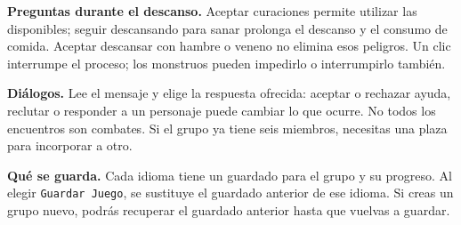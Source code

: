 \textbf{Preguntas durante el descanso.} Aceptar curaciones permite utilizar las disponibles; seguir descansando para sanar prolonga el descanso y el consumo de comida. Aceptar descansar con hambre o veneno no elimina esos peligros. Un clic interrumpe el proceso; los monstruos pueden impedirlo o interrumpirlo también.

\textbf{Diálogos.} Lee el mensaje y elige la respuesta ofrecida: aceptar o rechazar ayuda, reclutar o responder a un personaje puede cambiar lo que ocurre. No todos los encuentros son combates. Si el grupo ya tiene seis miembros, necesitas una plaza para incorporar a otro.

\textbf{Qué se guarda.} Cada idioma tiene un guardado para el grupo y su progreso. Al elegir \texttt{Guardar Juego}, se sustituye el guardado anterior de ese idioma. Si creas un grupo nuevo, podrás recuperar el guardado anterior hasta que vuelvas a guardar.
